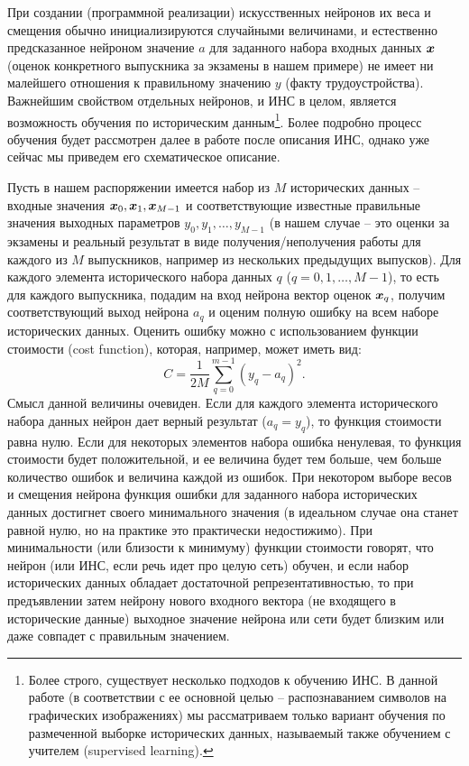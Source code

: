 \documentclass[a4paper,12pt,russian]{article} %
\begin{document}
При создании (программной реализации) искусственных нейронов их веса и смещения обычно инициализируются случайными величинами, и естественно предсказанное нейроном значение $a$ для заданного набора входных данных $\bm{x}$ (оценок конкретного выпускника за экзамены в нашем примере) не имеет ни малейшего отношения к правильному значению $y$ (факту трудоустройства).
Важнейшим свойством отдельных нейронов, и ИНС в целом, является возможность обучения по историческим данным\footnote{
	Более строго, существует несколько подходов к обучению ИНС. В данной работе (в соответствии с ее основной целью -- распознаванием символов на графических изображениях) мы рассматриваем только вариант обучения по размеченной выборке исторических данных, называемый также обучением с учителем (supervised learning).
}.
Более подробно процесс обучения будет рассмотрен далее в работе после описания ИНС, однако уже сейчас мы приведем его схематическое описание.

Пусть в нашем распоряжении имеется набор из $M$ исторических данных -- входные значения $\bm{x}_0, \bm{x}_1, \bm{x}_{M-1}$ и соответствующие известные правильные значения выходных параметров $y_0, y_1, \ldots, y_{M-1}$ (в нашем случае -- это оценки за экзамены и реальный результат в виде получения/неполучения работы для каждого из $M$ выпускников, например из нескольких предыдущих выпусков).
Для каждого элемента исторического набора данных $q$ ($q = 0, 1, \ldots, M-1$), то есть для каждого выпускника, подадим на вход нейрона вектор оценок $\bm{x}_q$, получим соответствующий выход нейрона $a_q$ и оценим полную ошибку на всем наборе исторических данных.
Оценить ошибку можно с использованием функции стоимости (cost function), которая, например, может иметь вид:
$$
C = \frac{1}{2M} \sum_{q=0}^{m-1} (y_q - a_q)^2.
$$
Смысл данной величины очевиден.
Если для каждого элемента исторического набора данных нейрон дает верный результат ($a_q = y_q$), то функция стоимости равна нулю.
Если для некоторых элементов набора ошибка ненулевая, то функция стоимости будет положительной, и ее величина будет тем больше, чем больше количество ошибок и величина каждой из ошибок.
При некотором выборе весов и смещения нейрона функция ошибки для заданного набора исторических данных достигнет своего минимального значения (в идеальном случае она станет равной нулю, но на практике это практически недостижимо).
При минимальности (или близости к минимуму) функции стоимости говорят, что нейрон (или ИНС, если речь идет про целую сеть) обучен, и если набор исторических данных обладает достаточной репрезентативностью, то при предъявлении затем нейрону нового входного вектора (не входящего в исторические данные) выходное значение нейрона или сети будет близким или даже совпадет с правильным значением.
\end{document}
